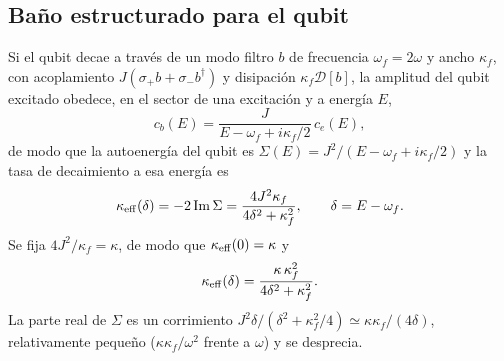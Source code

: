 \documentclass[11pt,a4paper]{article}
\newcommand{\spl}{\sigma_{+}}
\newcommand{\smi}{\sigma_{-}}
\newcommand{\D}{\mathcal{D}}
\theoremstyle{definition}
\begin{document}
\subsection{Baño estructurado para el qubit}
\label{sec:filtro}

Si el qubit decae a través de un modo filtro $b$ de frecuencia $\omega_f=2\omega$ y ancho $\kappa_f$, con acoplamiento $J(\spl b+\smi b^{\dagger})$ y disipación $\kappa_f\D[b]$, la amplitud del qubit excitado obedece, en el sector de una excitación y a energía $E$,
\begin{equation}
c_b(E)=\frac{J}{E-\omega_f+i\kappa_f/2}\,c_e(E),
\end{equation}
de modo que la autoenergía del qubit es $\Sigma(E)=J^2/(E-\omega_f+i\kappa_f/2)$ y la tasa de decaimiento a esa energía es
\begin{equation}
\kappa_{\rm eff}(\delta)=-2\,\mathrm{Im}\,\Sigma=\frac{4J^2\kappa_f}{4\delta^2+\kappa_f^2},\qquad \delta=E-\omega_f.
\end{equation}
Se fija $4J^2/\kappa_f=\kappa$, de modo que $\kappa_{\rm eff}(0)=\kappa$ y
\begin{equation}
\kappa_{\rm eff}(\delta)=\frac{\kappa\,\kappa_f^2}{4\delta^2+\kappa_f^2}.
\label{eq:keff}
\end{equation}
La parte real de $\Sigma$ es un corrimiento $J^2\delta/(\delta^2+\kappa_f^2/4)\simeq\kappa\kappa_f/(4\delta)$, relativamente pequeño ($\kappa\kappa_f/\omega^2$ frente a $\omega$) y se desprecia.
\end{document}

